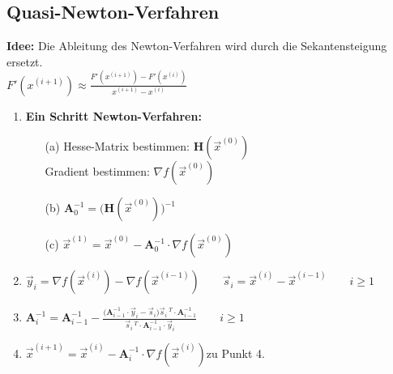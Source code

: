 \subsection{Quasi-Newton-Verfahren}
  \begin{minipage}{13cm}
  \textbf{Idee:} Die Ableitung des Newton-Verfahren wird durch die Sekantensteigung ersetzt.\\
  
  $F'(x^{(i+1)})\approx\frac{F'(x^{(i+1)})-F'(x^{(i)})}{x^{(i+1)}-x^{(i)}}$\\
  
 \begin{enumerate}
 \item \textbf{Ein Schritt Newton-Verfahren:}
	 \begin{enumerate}
	 \item[(a)] Hesse-Matrix bestimmen: $\mathbf{H}(\vec{x}^{(0)})$\\
	 Gradient bestimmen: $\nabla f(\vec{x}^{(0)})$
	 \item[(b)] $\mathbf{A}_{0}^{-1}=\bigl(\mathbf{H}(\vec{x}^{(0)})\bigr)^{-1}$
	 \item[(c)] $\vec{x}^{(1)}=\vec{x}^{(0)}-\mathbf{A}_{0}^{-1}\cdot\nabla f(\vec{x}^{(0)})$\\
	 \end{enumerate}
 \item $\vec{y}_i=\nabla f(\vec{x}^{(i)})-\nabla f(\vec{x}^{(i-1)})\qquad \vec{s}_i=\vec{x}^{(i)}-\vec{x}^{(i-1)} \qquad i\geq 1$
 \item $\mathbf{A}_{i}^{-1}=\mathbf{A}_{i-1}^{-1}-\displaystyle\frac{\bigl(\mathbf{A}_{i-1}^{-1}\cdot \vec{y}_i-\vec{s}_i\bigr)\vec{s}_i\,^T\cdot \mathbf{A}_{i-1}^{-1}}{\vec{s}_i\,^T\cdot \mathbf{A}_{i-1}^{-1}\cdot\vec{y}_i}\qquad i\geq 1$\\
 \item $\vec{x}^{(i+1)}=\vec{x}^{(i)}-\mathbf{A}_{i}^{-1}\cdot\nabla f(\vec{x}^{(i)})$\qquad zu Punkt 4.
 \end{enumerate}
 
\end{minipage}
